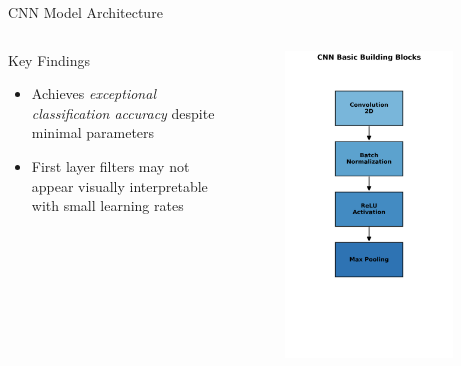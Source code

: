 \documentclass[aspectratio=169,8pt]{beamer}  %
\begin{document}
\begin{frame}{CNN Model Architecture}
\begin{columns}[T]
\begin{column}{0.6\textwidth}
\begin{alertblock}{Key Findings}
\begin{itemize}
\item Achieves \emph{exceptional classification accuracy} despite minimal parameters
\item First layer filters may not appear visually interpretable with small learning rates
\end{itemize}
\end{alertblock}
\end{column}
\begin{column}{0.4\textwidth}
\begin{figure}
\includegraphics[width=0.9\textwidth]{imgs/cnn_basic_block.png}
\end{figure}
\end{column}
\end{columns}
\end{frame}
\end{document}

